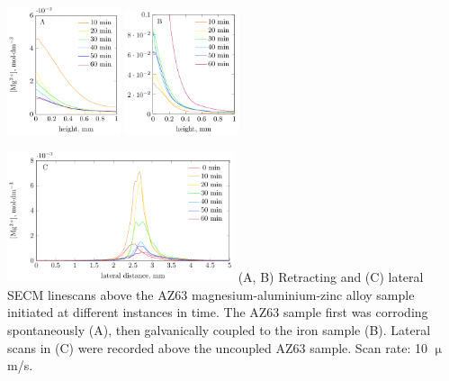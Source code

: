 \documentclass{beamer}
\begin{document}
\begin{frame}
\centering
\includegraphics[width=0.25\textwidth]{phd-figure14.pdf} \includegraphics[width=0.25\textwidth]{phd-figure15.pdf}

\includegraphics[width=0.5\textwidth]{phd-figure16.pdf}
\vfill
\small
(A, B) Retracting and (C) lateral SECM linescans above the AZ63 magnesium-aluminium-zinc alloy sample initiated at different instances in time.
The AZ63 sample first was corroding spontaneously (A), then galvanically coupled to the iron sample (B). Lateral scans in (C) were recorded above the uncoupled AZ63 sample.
Scan rate: 10 $\upmu$m/s.
\end{frame}
\end{document}

